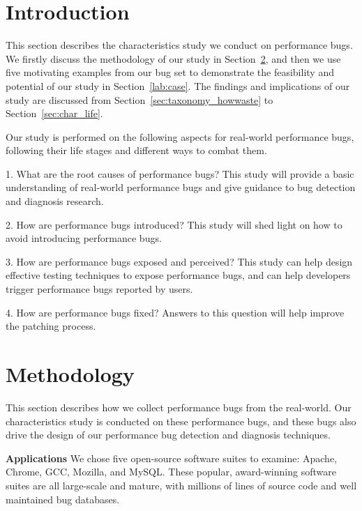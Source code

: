 \section{Introduction}
\label{sec:study}

This section describes the characteristics study we conduct on performance bugs.
We firstly discuss the methodology of our study in Section~\ref{sec:meth}, 
and then we use five motivating examples from our bug set 
to demonstrate the feasibility 
and potential of our study in Section~\ref{lab:case}. 
The findings and implications of our study are discussed 
from Section~\ref{sec:taxonomy_howwaste} to Section~\ref{sec:char_life}.

Our study is performed on the following aspects for real-world 
performance bugs, following their life stages and different ways to
combat them.

1. What are the root causes of performance bugs? This study will provide a
basic understanding of real-world performance bugs and
give guidance to bug detection and diagnosis research.

2. How are performance bugs introduced? This study will shed light on
how to avoid introducing performance bugs.

3. How are performance bugs exposed and perceived? This study can help
design effective testing techniques to expose performance bugs, and can help developers
trigger performance bugs reported by users.

4. How are performance bugs fixed?
Answers to this question will help improve the patching process.


\section{Methodology}
\label{sec:meth}

This section describes how we collect performance bugs from the real-world. 
Our characteristics study is conducted on these performance bugs, and 
these bugs also drive the design of our performance bug detection and diagnosis techniques. 

{\bf Applications}
We chose five open-source software suites to examine: Apache, Chrome, GCC, 
Mozilla, and MySQL. These popular, award-winning software suites 
\citep{halloffame} are all large-scale and mature, with millions of lines of 
source code and well maintained bug databases.

